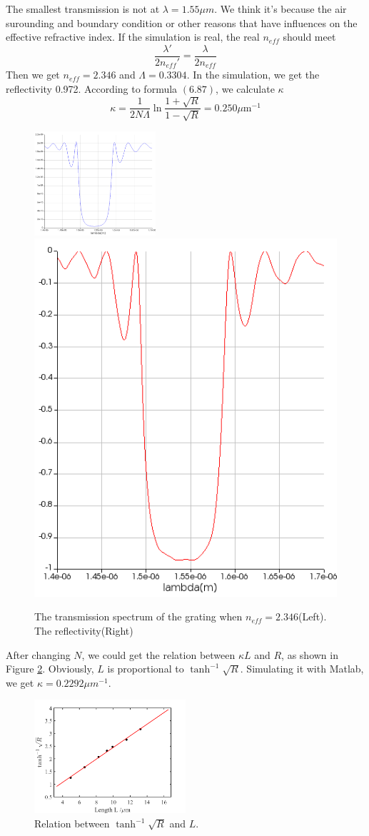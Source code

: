 \documentclass[fontsize=11pt]{scrartcl}
\begin{document}
The smallest transmission is not at $\lambda=1.55\mu m$. We think it's because the air surounding and boundary condition or other
reasons that have influences on the effective refractive index. If the simulation is real,
the real $n_{eff}$ should meet \\
\begin{equation}
    \frac{\lambda '}{2n_{eff }'}=\frac{\lambda }{2n_{eff}}
\end{equation}
Then we get $n_{eff}=2.346$ and $\Lambda=0.3304$. In the simulation, we get the reflectivity 0.972.
According to formula $(6.87)$, we calculate $\kappa$
\begin{equation}
    \kappa=\frac 1{2N\Lambda}\ln{\frac{1+\sqrt R}{1-\sqrt R}}=0.250  {\mu \mathrm{m}}^{-1}
\end{equation}
\begin{figure}[H]
    \centering
    \includegraphics[width=0.4\textwidth]{img/n2.3._Tpng.png}
    \hspace{10mm}
    \includegraphics[height=0.4\textwidth]{img/R.png}
    \caption{The transmission spectrum of the grating when $n_{eff}=2.346$(Left). The reflectivity(Right) }
    \label{n2.4_porpa}
\end{figure}
After changing $N$, we could get the relation between $\kappa L$ and $R$, as shown in Figure \ref{Rk}.
Obviously, $L$ is proportional to $\tanh^{-1}{\sqrt R}$. Simulating it with Matlab, we get $\kappa=0.2292\mu m^{-1}$.
\begin{figure}[H]
    \centering
    \includegraphics[width=0.5\textwidth]{img/kappa.png}
    \caption{Relation between $\tanh^{-1}{\sqrt R}$ and $L$. }
    \label{Rk}
\end{figure}
\end{document}
